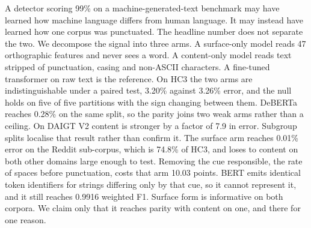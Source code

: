 A detector scoring 99\% on a machine-generated-text benchmark may have learned how machine language differs from human language. It may instead have learned how one corpus was punctuated. The headline number does not separate the two. We decompose the signal into three arms. A surface-only model reads 47 orthographic features and never sees a word. A content-only model reads text stripped of punctuation, casing and non-ASCII characters. A fine-tuned transformer on raw text is the reference. On HC3 the two arms are indistinguishable under a paired test, 3.20\% against 3.26\% error, and the null holds on five of five partitions with the sign changing between them. DeBERTa reaches 0.28\% on the same split, so the parity joins two weak arms rather than a ceiling. On DAIGT V2 content is stronger by a factor of 7.9 in error. Subgroup splits localise that result rather than confirm it. The surface arm reaches 0.01\% error on the Reddit sub-corpus, which is 74.8\% of HC3, and loses to content on both other domains large enough to test. Removing the cue responsible, the rate of spaces before punctuation, costs that arm 10.03 points. BERT emits identical token identifiers for strings differing only by that cue, so it cannot represent it, and it still reaches 0.9916 weighted F1. Surface form is informative on both corpora. We claim only that it reaches parity with content on one, and there for one reason.
